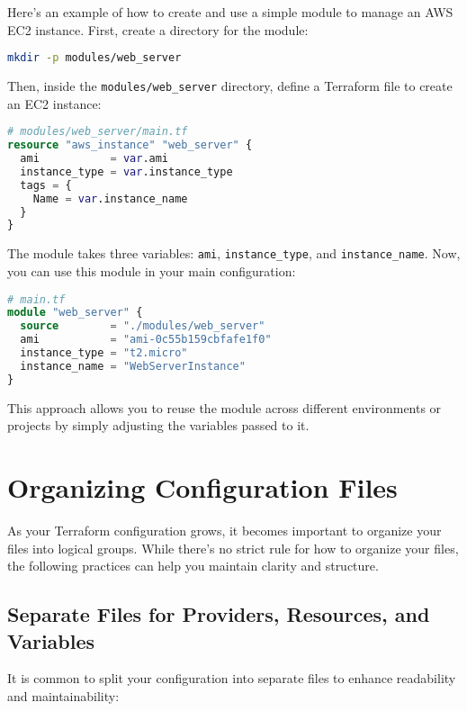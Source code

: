 Here's an example of how to create and use a simple module to manage an AWS EC2 instance. First, create a directory for the module:

\begin{lstlisting}[language=bash]
mkdir -p modules/web_server
\end{lstlisting}

Then, inside the \texttt{modules/web\_server} directory, define a Terraform file to create an EC2 instance:

\begin{lstlisting}[language=terraform]
# modules/web_server/main.tf
resource "aws_instance" "web_server" {
  ami           = var.ami
  instance_type = var.instance_type
  tags = {
    Name = var.instance_name
  }
}
\end{lstlisting}

The module takes three variables: \texttt{ami}, \texttt{instance\_type},
and \texttt{instance\_name}.
Now, you can use this module in your main configuration:

\begin{lstlisting}[language=terraform]
# main.tf
module "web_server" {
  source        = "./modules/web_server"
  ami           = "ami-0c55b159cbfafe1f0"
  instance_type = "t2.micro"
  instance_name = "WebServerInstance"
}
\end{lstlisting}

This approach allows you to reuse the module across different environments or projects by simply adjusting the variables passed to it.

\section{Organizing Configuration Files}

As your Terraform configuration grows, it becomes important to organize your files into logical groups. While there's no strict rule for how to organize your files, the following practices can help you maintain clarity and structure.

\subsection{Separate Files for Providers, Resources, and Variables}

It is common to split your configuration into separate files to enhance readability and maintainability:

